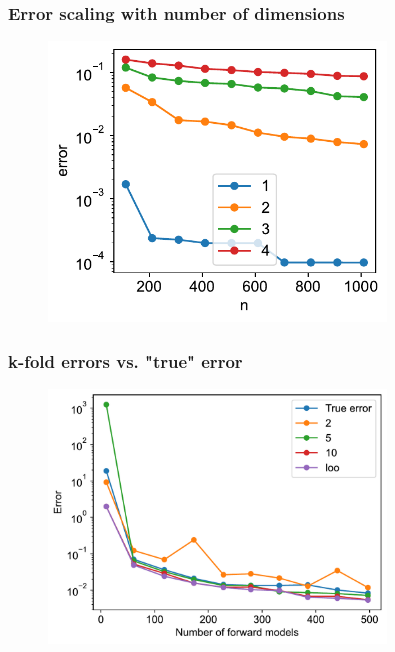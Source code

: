 \documentclass{beamer}
\begin{document}
    \begin{frame}
        \frametitle{Error scaling with number of dimensions}
        \begin{figure}
            \includegraphics[width=0.8\textwidth]{figs/errorrs_dim.pdf}
        \end{figure}
    \end{frame}
    \begin{frame}
        \frametitle{k-fold errors vs. "true" error}
        \begin{figure}
            \includegraphics[width=0.8\textwidth]{figs/k_errs.pdf}
        \end{figure}
    \end{frame}
\end{document}
